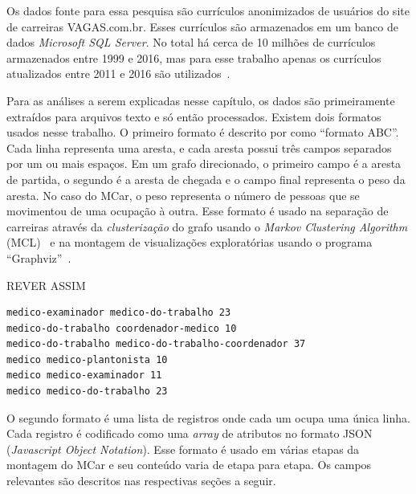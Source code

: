 \documentclass[12pt,a4paper,final]{article}
\begin{document}
Os dados fonte para essa pesquisa são currículos anonimizados de usuários do site de carreiras VAGAS.com.br. Esses currículos são armazenados em um banco de dados \textit{Microsoft SQL Server}. No total há cerca de 10 milhões de currículos~ armazenados entre 1999 e 2016, mas para esse trabalho apenas os currículos atualizados entre 2011 e 2016 são utilizados~.


Para as análises a serem explicadas nesse capítulo, os dados são primeiramente extraídos para arquivos texto e só então processados. Existem dois formatos usados nesse trabalho. O primeiro formato é descrito por  como \enquote{formato ABC}. Cada linha representa uma aresta, e cada aresta possui três campos separados por um ou mais espaços. Em um grafo direcionado, o primeiro campo é a aresta de partida, o segundo é a aresta de chegada e o campo final representa o peso da aresta. No caso do MCar, o peso representa o número de pessoas que se movimentou de uma ocupação à outra. Esse formato é usado na separação de carreiras através da \textit{clusterização} do grafo usando o \textit{Markov Clustering Algorithm} (MCL)~\cite{Van_Dongen2000-qm} e na montagem de visualizações exploratórias usando o programa \enquote{Graphviz}~\cite{Gansner2000-oo}.

\noindent
REVER ASSIM\begin{minipage}{\linewidth}
\begin{lstlisting}[frame=single,caption=Arquivo em Formato ABC,label=lst:formato-abc,captionpos=b]
medico-examinador medico-do-trabalho 23
medico-do-trabalho coordenador-medico 10
medico-do-trabalho medico-do-trabalho-coordenador 37
medico medico-plantonista 10
medico medico-examinador 11
medico medico-do-trabalho 23
\end{lstlisting}
\end{minipage}

O segundo formato é uma lista de registros onde cada um ocupa uma única linha. Cada registro é codificado como uma \textit{array} de atributos no formato JSON (\textit{Javascript Object Notation}). Esse formato é usado em várias etapas da montagem do MCar e seu conteúdo varia de etapa para etapa. Os campos relevantes são descritos nas respectivas seções a seguir.
\end{document}
